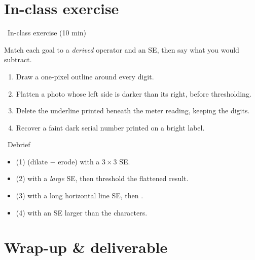 \documentclass[10pt,aspectratio=169]{beamer}
\begin{document}
\section{In-class exercise}

\begin{frame}{\faPen~In-class exercise (10 min)}
  \begin{infobox}
    Match each goal to a \emph{derived} operator and an SE, then say what you would subtract.
  \end{infobox}
  \begin{enumerate}
    \item Draw a one-pixel outline around every digit.
    \item Flatten a photo whose left side is darker than its right, before thresholding.
    \item Delete the underline printed beneath the meter reading, keeping the digits.
    \item Recover a faint dark serial number printed on a bright label.
  \end{enumerate}
\end{frame}

\begin{frame}{\faPen~Debrief}
  \begin{itemize}
    \item (1)  (dilate $-$ erode) with a $3\times3$ SE.
    \item (2)  with a \emph{large} SE, then threshold the flattened result.
    \item (3)  with a long horizontal line SE, then .
    \item (4)  with an SE larger than the characters.
  \end{itemize}
\end{frame}

\section{Wrap-up \& deliverable}
\end{document}
